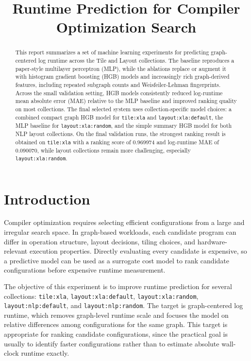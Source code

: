 \documentclass[11pt]{article}
\title{Runtime Prediction for Compiler Optimization Search}
\author{}
\date{}
\begin{document}
\maketitle

\begin{abstract}
This report summarizes a set of machine learning experiments for predicting graph-centered log runtime across the Tile and Layout collections. The baseline reproduces a paper-style multilayer perceptron (MLP), while the ablations replace or augment it with histogram gradient boosting (HGB) models and increasingly rich graph-derived features, including repeated subgraph counts and Weisfeiler-Lehman fingerprints. Across the small validation setting, HGB models consistently reduced log-runtime mean absolute error (MAE) relative to the MLP baseline and improved ranking quality on most collections. The final selected system uses collection-specific model choices: a combined compact graph HGB model for \texttt{tile:xla} and \texttt{layout:xla:default}, the MLP baseline for \texttt{layout:xla:random}, and the simple summary HGB model for both NLP layout collections. On the final validation runs, the strongest ranking result is obtained on \texttt{tile:xla} with a ranking score of 0.969974 and log-runtime MAE of 0.090070, while layout collections remain more challenging, especially \texttt{layout:xla:random}.
\end{abstract}

\section{Introduction}
Compiler optimization requires selecting efficient configurations from a large and irregular search space. In graph-based workloads, each candidate program can differ in operation structure, layout decisions, tiling choices, and hardware-relevant execution properties. Directly evaluating every candidate is expensive, so a predictive model can be used as a surrogate cost model to rank candidate configurations before expensive runtime measurement.

The objective of this experiment is to improve runtime prediction for several collections: \texttt{tile:xla}, \texttt{layout:xla:default}, \texttt{layout:xla:random}, \texttt{layout:nlp:default}, and \texttt{layout:nlp:random}. The target is graph-centered log runtime, which removes graph-level runtime scale and focuses the model on relative differences among configurations for the same graph. This target is appropriate for ranking candidate configurations, since the practical goal is usually to identify faster configurations rather than to estimate absolute wall-clock runtime exactly.
\end{document}
